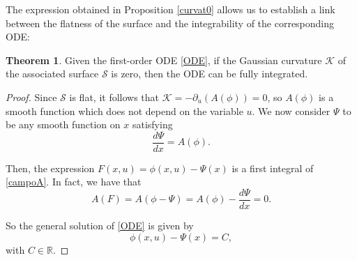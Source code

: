 \documentclass{article}
\theoremstyle{remark}
\theoremstyle{definition}
\newtheorem{theorem}[remark]{Theorem}
\begin{document}
The expression obtained in Proposition \ref{curvat0} allows us to establish a link between the flatness of the surface and the integrability of the corresponding ODE:
\begin{theorem}\label{th:integr}
Given the first-order ODE \eqref{ODE}, if the Gaussian curvature $\mathcal{K}$ of the associated surface $\mathcal{S}$ is zero, then the ODE can be fully integrated.
\end{theorem}

\begin{proof}

Since $\mathcal{S}$ is flat, it follows that $\mathcal{K}=-\partial_u(A(\phi))=0$, so $A(\phi)$ is a smooth function which does not depend on the variable $u$. We now consider $\Psi$ to be any smooth function on $x$ satisfying
$$
\dfrac{d\Psi}{dx}=A(\phi).
$$

Then, the expression $F(x,u)=\phi(x,u)-\Psi(x)$ is a first integral of \eqref{campoA}. In fact, we have that 
$$
A(F)=A(\phi-\Psi)=A(\phi)-\dfrac{d\Psi}{dx}=0.
$$

So the general solution of \eqref{ODE} is given by 
$$
\phi(x,u)-\Psi(x)=C,
$$
with $C\in \mathbb R$.
\end{proof}
\end{document}
